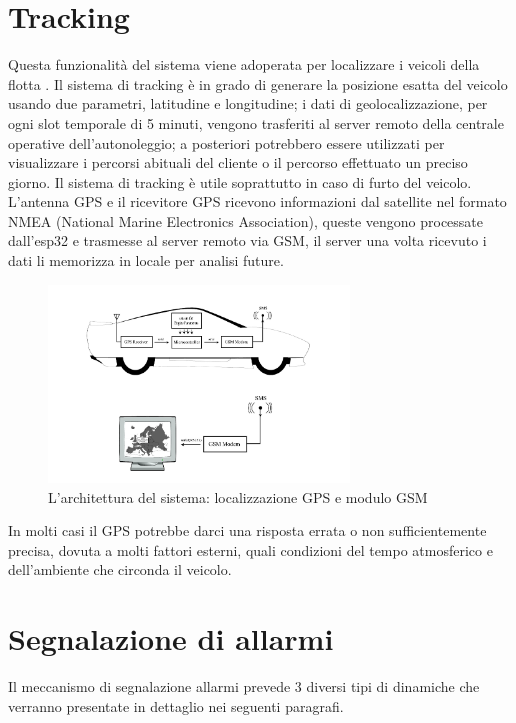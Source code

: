 \documentclass[12pt, a4paper, italian]{report}
\numberwithin{figure}{chapter}
\numberwithin{table}{chapter}
\begin{document}
\section{Tracking}
Questa funzionalità del sistema viene adoperata per localizzare i veicoli della flotta \cite{al2012hybrid}. Il sistema di tracking è in grado di generare la posizione esatta del veicolo usando due parametri, latitudine e longitudine; i dati di geolocalizzazione, per ogni slot temporale di 5 minuti, vengono trasferiti al server remoto della centrale operative dell'autonoleggio; a posteriori potrebbero essere utilizzati per visualizzare i percorsi abituali del cliente o il percorso effettuato un preciso giorno. Il sistema di tracking è utile soprattutto in caso di furto del veicolo.
L'antenna GPS e il ricevitore GPS ricevono informazioni dal satellite nel formato NMEA (National Marine Electronics Association), queste vengono processate dall'esp32 e trasmesse al server remoto via GSM, il server una volta ricevuto i dati li memorizza in locale per analisi future. 

\begin{figure}[h] \centering
\includegraphics[width=8cm]{tracking.png}
\caption{L'architettura del sistema: localizzazione GPS e modulo GSM\protect\footnotemark}
\label{fig:trackingGPS}
\end{figure}

In molti casi il GPS potrebbe darci una risposta errata o non sufficientemente precisa, dovuta a molti fattori esterni, quali condizioni del tempo atmosferico e dell'ambiente che circonda il veicolo.

\section{Segnalazione di allarmi}
Il meccanismo di segnalazione allarmi prevede 3 diversi tipi di dinamiche che verranno presentate in dettaglio nei seguenti paragrafi. 
\end{document}
